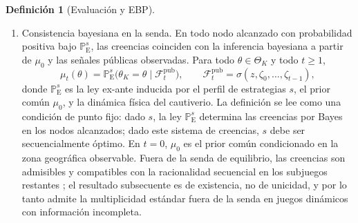 \documentclass[review,authoryear,12pt]{elsarticle}
\providecommand{\textcite}{\citet}
\theoremstyle{plain}
\theoremstyle{definition}
\newtheorem{definition}[theorem]{Definición}
\newcommand{\ProbE}{\mathbb{P}_{\mathrm{E}}}
\newcommand{\ThetaK}{\Theta_K}
\newcommand{\1}{\mathbf{1}}
\begin{document}
\begin{definition}[Evaluación y EBP]
\begin{enumerate}
  \item[\textup{(b)}] Consistencia bayesiana en la senda. En todo nodo alcanzado con probabilidad positiva bajo $\ProbE^s$, las creencias coinciden con la inferencia bayesiana a partir de $\mu_0$ y las señales públicas observadas. Para todo $\theta\in\ThetaK$ y todo $t\ge 1$,
  \begin{equation}
  \label{eq:def712-bayes-mu}
  \mu_t(\theta)=\ProbE^s\!\bigl(\theta_K=\theta\mid \mathcal{F}_t^{\mathrm{pub}}\bigr),
  \qquad
  \mathcal{F}_t^{\mathrm{pub}}=\sigma(z,\zeta_0,\ldots,\zeta_{t-1}),
  \end{equation}
  donde $\ProbE^s$ es la ley ex-ante inducida por el perfil de estrategias $s$, el prior común $\mu_0$, y la dinámica física del cautiverio. La definición se lee como una condición de punto fijo: dado $s$, la ley $\ProbE^s$ determina las creencias por Bayes en los nodos alcanzados; dado este sistema de creencias, $s$ debe ser secuencialmente óptimo. En $t=0$, $\mu_0$ es el prior común condicionado en la zona geográfica observable. Fuera de la senda de equilibrio, las creencias son admisibles y compatibles con la racionalidad secuencial en los subjuegos restantes \textcite{FudenbergTirole1991,KrepsWilson1982}; el resultado subsecuente es de existencia, no de unicidad, y por lo tanto admite la multiplicidad estándar fuera de la senda en juegos dinámicos con información incompleta.
\end{enumerate}
\end{definition}
\end{document}
